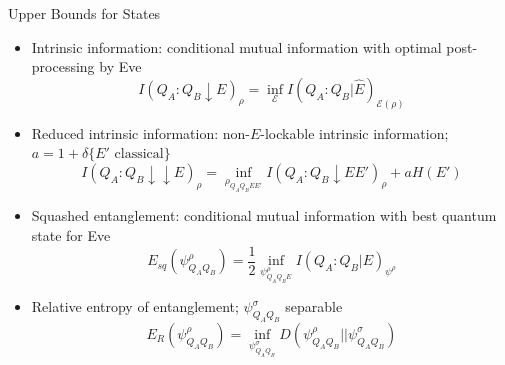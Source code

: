 \documentclass[xcolor=dvipsnames]{beamer}
\newcommand{\?}{\mathrel{?}} %
\newcommand{\cE}{\mathcal{E}}
\begin{document}

\begin{frame}{Upper Bounds for States}
  \begin{itemize}[<+->]
    \item Intrinsic information: conditional mutual information with optimal post-processing by Eve
      \[ I{(Q_A : Q_B \downarrow E)}_{\rho} = \inf_{\cE} I{(Q_A : Q_B|\hat{E})}_{\cE(\rho)} \]
    \item Reduced intrinsic information: non-\(E\)-lockable intrinsic information; \(a = 1 + \delta\{E' \text{ classical}\}\)
      \[ 
        I{(Q_A : Q_B \downarrow\downarrow E)}_{\rho} = \inf_{\rho_{Q_A Q_B EE'}}
        I{(Q_A : Q_B \downarrow EE')}_{\rho} + aH(E')
 \]
    \item Squashed entanglement: conditional mutual information with best quantum state for Eve
      \[ E_{sq}({\psi^{\rho}_{Q_A Q_B}}) = \frac{1}{2} \inf_{\psi^{\rho}_{Q_A Q_B E}} I{(Q_A:Q_B|E)}_{\psi^\rho} \]
    \item Relative entropy of entanglement; \(\psi^{\sigma}_{Q_A Q_B}\) separable
      \[ E_R\left({\psi^{\rho}_{Q_A Q_B}}\right) = \inf_{\psi^{\sigma}_{Q_A Q_B}} D(\psi^{\rho}_{Q_A Q_B}||\psi^{\sigma}_{Q_A Q_B}) \]
  \end{itemize}
\end{frame}
\end{document}
